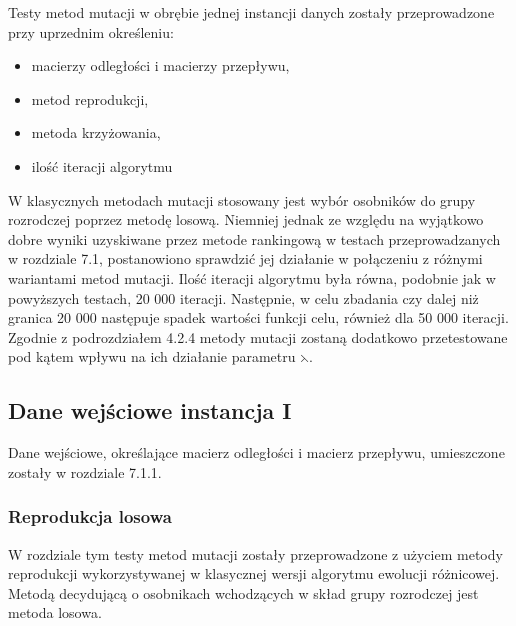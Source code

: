 Testy metod mutacji w obrębie jednej instancji danych zostały przeprowadzone przy uprzednim określeniu:
\begin{itemize}
\item
macierzy odległości i macierzy przepływu,
\item
metod reprodukcji,
\item
metoda krzyżowania,
\item
ilość iteracji algorytmu
\end{itemize}
\par
W klasycznych metodach mutacji stosowany jest wybór osobników do grupy rozrodczej poprzez metodę losową. Niemniej jednak ze względu na wyjątkowo dobre wyniki uzyskiwane przez metode rankingową w testach przeprowadzanych w rozdziale 7.1, postanowiono sprawdzić jej działanie w połączeniu z różnymi wariantami metod mutacji. Ilość iteracji algorytmu była równa, podobnie jak w powyższych testach, 20 000 iteracji. Następnie, w celu zbadania czy dalej niż granica 20 000 następuje spadek wartości funkcji celu, również dla 50 000 iteracji. Zgodnie z podrozdziałem 4.2.4 metody mutacji zostaną dodatkowo przetestowane pod kątem wpływu na ich działanie parametru $\leftthreetimes$.

\subsection{Dane wejściowe instancja I}
Dane wejściowe, określające macierz odległości i macierz przepływu, umieszczone zostały w rozdziale 7.1.1.



\subsubsection{Reprodukcja losowa}
W rozdziale tym testy metod mutacji zostały przeprowadzone z użyciem metody reprodukcji wykorzystywanej w klasycznej wersji algorytmu ewolucji różnicowej. Metodą decydującą o osobnikach wchodzących w skład grupy rozrodczej jest metoda losowa.\\
\par

